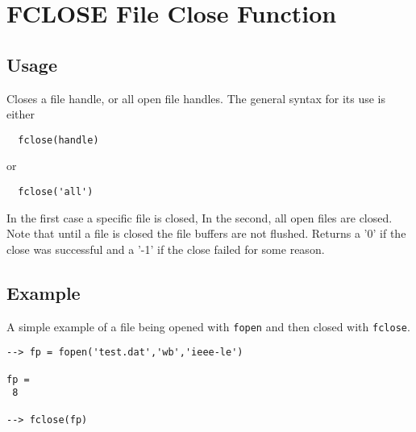 \section{FCLOSE File Close Function}

\subsection{Usage}

Closes a file handle, or all open file handles.  The general syntax
for its use is either
\begin{verbatim}
  fclose(handle)
\end{verbatim}
or
\begin{verbatim}
  fclose('all')
\end{verbatim}
In the first case a specific file is closed,  In the second, all open
files are closed.  Note that until a file is closed the file buffers
are not flushed.  Returns a '0' if the close was successful and a '-1' if
the close failed for some reason.
\subsection{Example}

A simple example of a file being opened with \verb|fopen| and then closed with \verb|fclose|.
\begin{verbatim}
--> fp = fopen('test.dat','wb','ieee-le')

fp = 
 8 

--> fclose(fp)
\end{verbatim}
